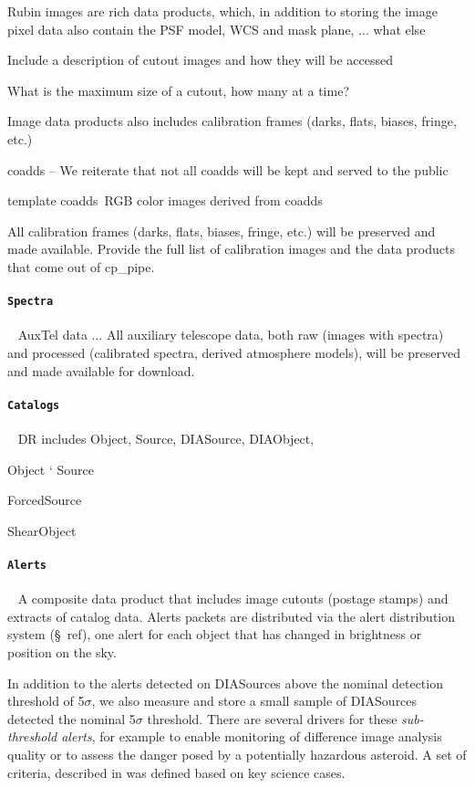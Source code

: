 Rubin images  are rich data products, which, in addition to storing the image pixel data also contain the PSF model, WCS and mask plane, ... what else

Include a description of cutout images and how they will be accessed

What is the maximum size of a cutout, how many at a time?

Image data products also includes   calibration frames (darks, flats, biases, fringe, etc.) 

coadds -- We reiterate that not all coadds will be kept and served to the public

template coadds\
RGB color images derived from coadds	

All calibration frames (darks, flats, biases, fringe, etc.) will be preserved and made available. 
Provide the full list of calibration images and the data products that come out of cp\_pipe.


\paragraph {\tt Spectra}~
AuxTel data ... 
All auxiliary telescope data, both raw (images with spectra) and processed (calibrated spectra,
derived atmosphere models), will be preserved and made available for download.


\paragraph {\tt  Catalogs}~
DR includes Object, Source, DIASource, DIAObject,

Object
`
Source 

ForcedSource

ShearObject

\paragraph {\tt  Alerts}~
A composite data product that includes image cutouts (postage stamps) and extracts of catalog data.
Alerts packets are distributed via the alert distribution system (\S~ref), one alert for each object that 	has changed in brightness or position on the sky.



In addition to the alerts detected on DIASources above the nominal detection threshold of 5$\sigma$, we  also measure and store a small sample of DIASources detected the nominal 5$\sigma$ threshold.
There are several drivers  for these \emph{sub-threshold alerts}, for example to enable monitoring of difference image analysis quality or to assess the danger posed by a potentially hazardous asteroid.
A set of criteria, described in \citep{dmtn-228}  was defined  based on key science cases.


